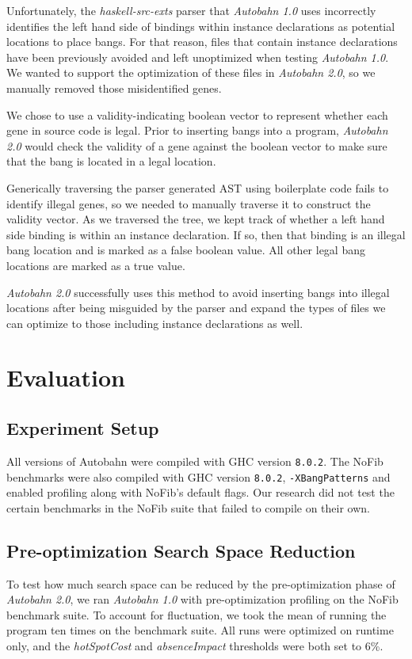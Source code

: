 \documentclass[format=sigplan]{acmart}
\newcommand{\hotspotcost}[0]{\textit{hotSpotCost}}
\newcommand{\Ao}[0]{\textit{Autobahn 1.0}}
\newcommand{\At}[0]{\textit{Autobahn 2.0}}
\newcommand{\preopt}[0]{pre-optimization}
\newcommand{\Preopt}[0]{Pre-optimization}
\newcommand{\absim}[0]{\textit{absenceImpact}}
\begin{document}
Unfortunately, the \textit{haskell-src-exts} parser that \Ao{} uses incorrectly identifies the left hand side of bindings within instance declarations as potential locations to place bangs. For that reason, files that contain instance declarations have been previously avoided and left unoptimized when testing \Ao{}. We wanted to support the optimization of these files in \At{}, so we manually removed those misidentified genes.

We chose to use a validity-indicating boolean vector to represent whether each gene in source code is legal. Prior to inserting bangs into a program, \At{} would check the validity of a gene against the boolean vector to make sure that the bang is located in a legal location.

Generically traversing the parser generated AST using boilerplate code fails to identify illegal genes, so we needed to manually traverse it to construct the validity vector. As we traversed the tree, we kept track of whether a left hand side binding is within an instance declaration. If so, then that binding is an illegal bang location and is marked as a false boolean value. All other legal bang locations are marked as a true value.

\At{} successfully uses this method to avoid inserting bangs into illegal locations after being misguided by the parser and expand the types of files we can optimize to those including instance declarations as well. 

\section{Evaluation}

\subsection{Experiment Setup}

All versions of Autobahn were compiled with GHC version \texttt{8.0.2}. The NoFib benchmarks were also compiled with GHC version \texttt{8.0.2}, \texttt{-XBangPatterns} and enabled profiling along with NoFib's default flags. Our research did not test the certain benchmarks in the NoFib suite that failed to compile on their own.

\subsection{\Preopt{} Search Space Reduction}
To test how much search space can be reduced by the \preopt{} phase of \At{}, we ran \Ao{} with \preopt{} profiling on the NoFib benchmark suite. To account for fluctuation, we took the mean of running the program ten times on the benchmark suite. All runs were optimized on runtime only, and the \hotspotcost{} and \absim{} thresholds were both set to 6\%. 
\end{document}
